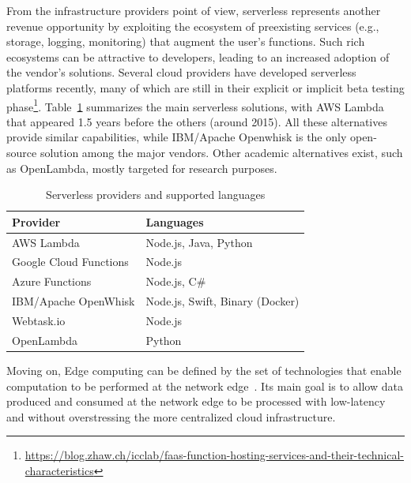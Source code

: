 From the infrastructure providers point of view, serverless represents another revenue opportunity by exploiting the ecosystem of preexisting services (e.g., storage, logging, monitoring) that augment the user's functions. %
Such rich ecosystems can be attractive to developers, leading to an increased adoption of the vendor's solutions. Several cloud providers have developed serverless platforms recently, many of which are still in their explicit or implicit beta testing phase\footnote{\url{https://blog.zhaw.ch/icclab/faas-function-hosting-services-and-their-technical-characteristics}}. Table~\ref{tab:FaaS-providers-and} summarizes the main serverless solutions, with AWS Lambda that appeared 1.5 years before the others (around 2015). All these alternatives provide similar capabilities, while IBM/Apache Openwhisk is the only open-source solution among the major vendors. Other academic alternatives exist, such as OpenLambda\cite{Hendrickson:2016}, mostly targeted for research purposes.

\begin{table}[hbt]
\centering
\caption{Serverless providers and supported languages\label{tab:FaaS-providers-and}}{
\begin{tabular}{ll}
\toprule 
\textbf{Provider} & \textbf{Languages}\tabularnewline
\midrule
AWS Lambda & Node.js, Java, Python\tabularnewline
Google Cloud Functions & Node.js\tabularnewline
Azure Functions & Node.js, C\#\tabularnewline
IBM/Apache OpenWhisk & Node.js, Swift, Binary (Docker)\tabularnewline
Webtask.io & Node.js\tabularnewline
OpenLambda & Python\tabularnewline
\bottomrule
\end{tabular}}
\end{table}




Moving on, Edge computing can be defined by the set of technologies that enable computation to be performed at the network edge~\cite{Shi:2016}. Its main goal is to allow data produced and consumed at the network edge to be processed with low-latency and without overstressing the more centralized cloud infrastructure.

